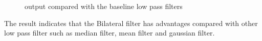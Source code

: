 \documentclass[12pt]{article}
\begin{document}
\begin{figure}[H]
{  }
  \caption{output compared with the baseline low pass filters}
\end{figure}

The result indicates that the Bilateral filter has advantages compared with other low pass filter such as median filter, mean filter and gaussian filter.


\end{document}
